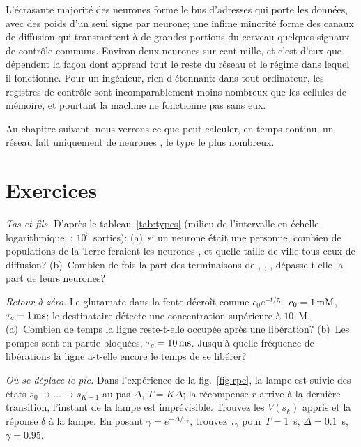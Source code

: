L'écrasante majorité des neurones forme le bus d'adresses qui porte les données, avec des poids d'un seul signe par neurone; une infime minorité forme des canaux de diffusion qui transmettent à de grandes portions du cerveau quelques signaux de contrôle communs. Environ deux neurones sur cent mille, et c'est d'eux que dépendent la façon dont apprend tout le reste du réseau et le régime dans lequel il fonctionne. Pour un ingénieur, rien d'étonnant: dans tout ordinateur, les registres de contrôle sont incomparablement moins nombreux que les cellules de mémoire, et pourtant la machine ne fonctionne pas sans eux.

Au chapitre suivant, nous verrons ce que peut calculer, en temps continu, un réseau fait uniquement de neurones , le type le plus nombreux.

\section{Exercices}

\begin{exercise}[\lvlA]
\label{ex:01:1}
\emph{Tas et fils.} D'après le tableau~\ref{tab:types} (milieu de l'intervalle en échelle logarithmique; : $10^5$ sorties): (a)~si un neurone était une personne, combien de populations de la Terre feraient les neurones , et quelle taille de ville tous ceux de diffusion? (b)~Combien de fois la part des terminaisons de , , ,  dépasse-t-elle la part de leurs neurones?
\end{exercise}

\begin{exercise}[\lvlA]
\label{ex:01:2}
\emph{Retour à zéro.} Le glutamate dans la fente décroît comme $c_0e^{-t/\tau_c}$, $c_0=1\,\text{mM}$, $\tau_c=1\,\text{ms}$; le destinataire détecte une concentration supérieure à $10$~\textmu M. (a)~Combien de temps la ligne reste-t-elle \og occupée\fg{} après une libération? (b)~Les pompes sont en partie bloquées, $\tau_c=10\,\text{ms}$. Jusqu'à quelle fréquence de libérations la ligne a-t-elle encore le temps de se libérer?
\end{exercise}

\begin{exercise}[\lvlB]
\label{ex:01:3}
\emph{Où se déplace le pic.} Dans l'expérience de la fig.~\ref{fig:rpe}, la lampe est suivie des états $s_0\to\dots\to s_{K-1}$ au pas $\Delta$, $T=K\Delta$; la récompense $r$ arrive à la dernière transition, l'instant de la lampe est imprévisible. Trouvez les $V(s_k)$ appris et la réponse $\delta$ à la lampe. En posant $\gamma=e^{-\Delta/\tau_\gamma}$, trouvez $\tau_\gamma$ pour $T=1$~s, $\Delta=0.1$~s, $\gamma=0.95$.
\end{exercise}

